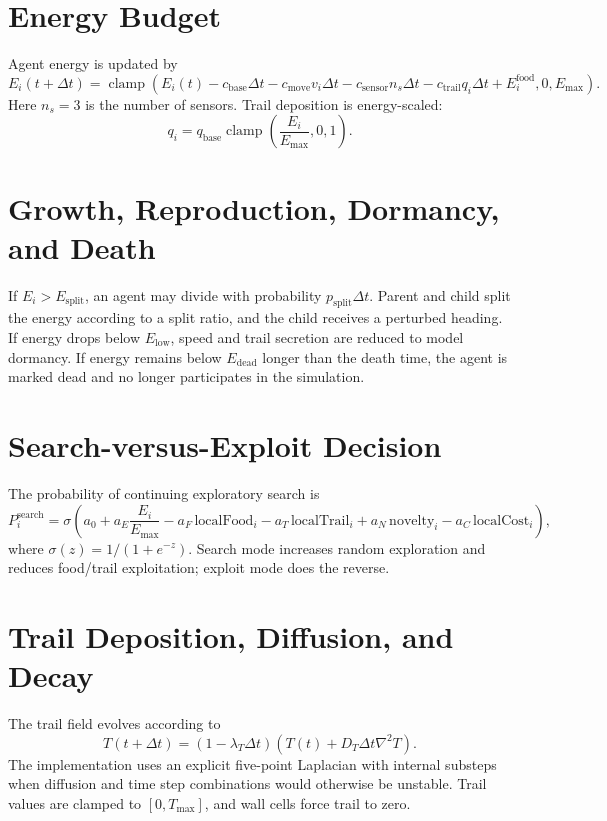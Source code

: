 \documentclass[11pt]{article}
\begin{document}
\section{Energy Budget}
Agent energy is updated by
\begin{equation}
\label{eq:energy-budget}
E_i(t+\Delta t) =
\operatorname{clamp}\left(
E_i(t)
- c_{\mathrm{base}}\Delta t
- c_{\mathrm{move}}v_i\Delta t
- c_{\mathrm{sensor}}n_s\Delta t
- c_{\mathrm{trail}}q_i\Delta t
+ E^{\mathrm{food}}_i,
0,E_{\max}
\right).
\end{equation}
Here $n_s=3$ is the number of sensors. Trail deposition is energy-scaled:
\begin{equation}
\label{eq:trail-deposit}
q_i = q_{\mathrm{base}}\operatorname{clamp}\left(\frac{E_i}{E_{\max}},0,1\right).
\end{equation}

\section{Growth, Reproduction, Dormancy, and Death}
If $E_i > E_{\mathrm{split}}$, an agent may divide with probability
$p_{\mathrm{split}}\Delta t$. Parent and child split the energy according to
a split ratio, and the child receives a perturbed heading. If energy drops below
$E_{\mathrm{low}}$, speed and trail secretion are reduced to model dormancy. If
energy remains below $E_{\mathrm{dead}}$ longer than the death time, the agent is
marked dead and no longer participates in the simulation.

\section{Search-versus-Exploit Decision}
The probability of continuing exploratory search is
\begin{equation}
\label{eq:p-search}
P^{\mathrm{search}}_i =
\sigma\left(
a_0
+ a_E\frac{E_i}{E_{\max}}
- a_F\,\mathrm{localFood}_i
- a_T\,\mathrm{localTrail}_i
+ a_N\,\mathrm{novelty}_i
- a_C\,\mathrm{localCost}_i
\right),
\end{equation}
where $\sigma(z)=1/(1+e^{-z})$. Search mode increases random exploration and
reduces food/trail exploitation; exploit mode does the reverse.

\section{Trail Deposition, Diffusion, and Decay}
The trail field evolves according to
\begin{equation}
\label{eq:trail-diffusion}
T(t+\Delta t) =
(1-\lambda_T\Delta t)\left(T(t)+D_T\Delta t\nabla^2 T\right).
\end{equation}
The implementation uses an explicit five-point Laplacian with internal substeps
when diffusion and time step combinations would otherwise be unstable. Trail values
are clamped to $[0,T_{\max}]$, and wall cells force trail to zero.
\end{document}

